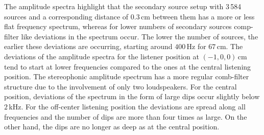 The amplitude spectra highlight that the secondary source setup with 3\,584
sources and a corresponding distance of $0.3$\,cm between them has a more or
less flat frequency spectrum, whereas for lower numbers of secondary sources
comp-filter like deviations in the spectrum occur. The lower the number of
sources, the earlier these deviations are occurring, starting around $400$\,Hz for 
$67$\,cm.
The deviations of the amplitude spectra for the listener position
at $(-1,0,0)$\,cm tend to start at lower frequencies compared to the ones at the central
listening position.
The stereophonic amplitude spectrum has a more regular comb-filter structure due
to the involvement of only two loudspeakers. For the central position, deviations
of the spectrum in the form of large dips occur slightly below $2$\,kHz.
For the off-center listening position the deviations are spread along all
frequencies and the number of dips are more than four times as large. On the
other hand, the dips are no longer as deep as at the central position.

